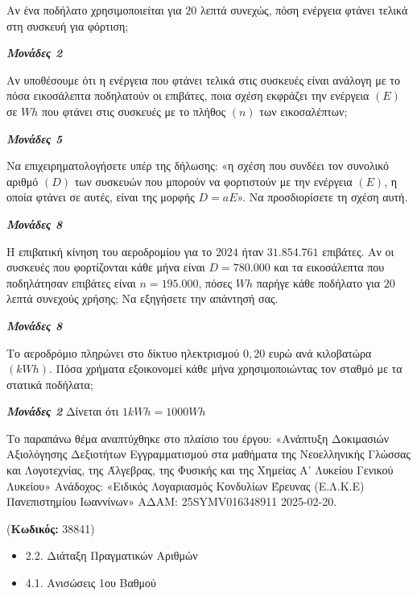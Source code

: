 \documentclass[11pt,a4paper,twoside]{book}
\newcounter{askhsh}[chapter]
\renewcommand{\theaskhsh}{
	\bf{\titlefont{\Large{\thechapter}}.\arabic{askhsh}}
}
\newcommand{\Askhsh}[2]{\refstepcounter{askhsh}{\titlefont{Άσκηση\theaskhsh} - \textcolor{maincolor}{ΘΕΜΑ #2}} ({\small{\textbf{Κωδικός:} #1}})\\}{}
\newenvironment{ylh}{
\begin{tcolorbox}[
breakable,
enhanced standard,
titlerule=0pt,
toprule=0pt, 
rightrule=0pt, 
bottomrule=0pt,
title={\titlefont Ύλη άσκησης},
colback=white,
opacityback=0,
left=2mm,
top=1mm,
bottom=0mm,
boxrule=0pt,
colframe=white,
borderline west={1.5mm}{0pt}{secondarycolor},
leftrule=2mm,
sharp corners,
coltitle=black
]
\begin{itemize}[leftmargin=3mm, itemsep=0mm, label=\textcolor{secondarycolor}{{\small\faBook}}]
}{
\end{itemize}
\end{tcolorbox}
}
\newcommand{\monades}[1]{
\hspace*{\fill}
\textbf{\textit{\textcolor{maincolor}{Μονάδες #1}}}}
\begin{document}
\begin{alist}
\item Αν ένα ποδήλατο χρησιμοποιείται για $20$ λεπτά συνεχώς, πόση ενέργεια φτάνει τελικά στη συσκευή για φόρτιση;
\monades{2}
\item

\begin{rlist}
\item Αν υποθέσουμε ότι η ενέργεια που φτάνει τελικά στις συσκευές είναι ανάλογη με το πόσα εικοσάλεπτα ποδηλατούν οι επιβάτες, ποια σχέση εκφράζει την ενέργεια $(E)$ σε $Wh$ που φτάνει στις συσκευές με το πλήθος $(n)$ των εικοσαλέπτων;
\monades{5}
\item Να επιχειρηματολογήσετε υπέρ της δήλωσης: «η σχέση που συνδέει τον συνολικό αριθμό $(D)$ των συσκευών που μπορούν να φορτιστούν με την ενέργεια $(E)$, η οποία φτάνει σε αυτές, είναι της μορφής $D = a E$». Να προσδιορίσετε τη σχέση αυτή.
\monades{8}
\end{rlist}
\item

\begin{rlist}
\item Η επιβατική κίνηση του αεροδρομίου για το $2024$ ήταν $31.854.761$ επιβάτες. Αν οι συσκευές που φορτίζονται κάθε μήνα είναι $D = 780.000$ και τα εικοσάλεπτα που ποδηλάτησαν επιβάτες είναι $n = 195.000$, πόσες $Wh$ παρήγε κάθε ποδήλατο για $20\ $λεπτά συνεχούς χρήσης; Να εξηγήσετε την απάντησή σας.
\monades{8}
\item Το αεροδρόμιο πληρώνει στο δίκτυο ηλεκτρισμού $0,20$ ευρώ ανά κιλοβατώρα $(kWh)$. Πόσα χρήματα εξοικονομεί κάθε μήνα χρησιμοποιώντας τον σταθμό με τα στατικά ποδήλατα;
\monades{2}
Δίνεται ότι $1\si{kWh} = 1000\si{Wh}$

{\footnotesize Το παραπάνω θέμα αναπτύχθηκε στο πλαίσιο του έργου: «Ανάπτυξη Δοκιμασιών Αξιολόγησης Δεξιοτήτων Εγγραμματισμού στα μαθήματα της Νεοελληνικής Γλώσσας και Λογοτεχνίας, της Άλγεβρας, της Φυσικής και της Χημείας Α' Λυκείου Γενικού Λυκείου» Ανάδοχος: «Ειδικός Λογαριασμός Κονδυλίων Έρευνας (Ε.Λ.Κ.Ε) Πανεπιστημίου Ιωαννίνων» ΑΔΑΜ: 25SYMV016348911 2025-02-20.}
\end{rlist}
\end{alist}

\vspace{4mm}
\Askhsh{38841}{4}
\begin{ylh}
    \item 2.2. Διάταξη Πραγματικών Αριθμών
    \item 4.1. Ανισώσεις 1ου Βαθμού
\end{ylh}
\end{document}
